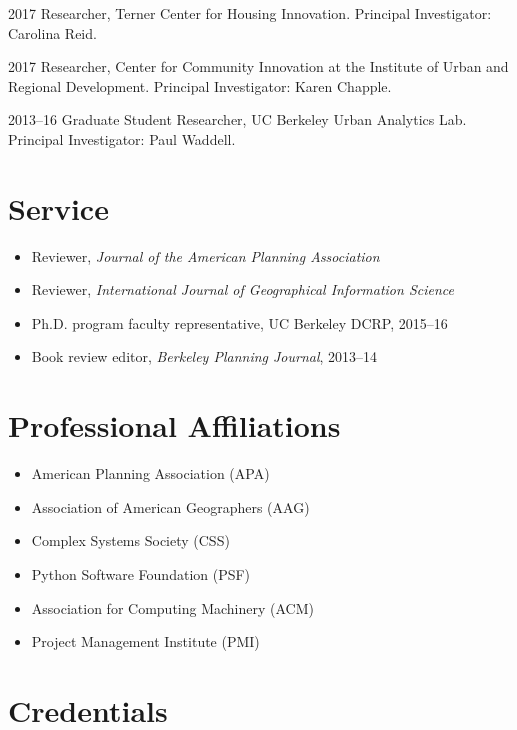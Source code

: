 \documentclass{academiccv}
\begin{document}
\begin{tablist}
\item[2017] 	\tab Researcher, Terner Center for Housing Innovation. Principal Investigator: Carolina Reid.
\item[2017] 	\tab Researcher, Center for Community Innovation at the Institute of Urban and Regional Development. Principal Investigator: Karen Chapple.
\item[2013--16] \tab Graduate Student Researcher, UC Berkeley Urban Analytics Lab. Principal Investigator: Paul Waddell.
\end{tablist}



\section*{Service}

\begin{itemize}
\item Reviewer, \emph{Journal of the American Planning Association}
\item Reviewer, \emph{International Journal of Geographical Information Science}
\item Ph.D. program faculty representative, UC Berkeley DCRP, 2015--16
\item Book review editor, \emph{Berkeley Planning Journal}, 2013--14
\end{itemize}



\section*{Professional Affiliations}

\begin{itemize}
\item American Planning Association (APA)
\item Association of American Geographers (AAG)
\item Complex Systems Society (CSS)
\item Python Software Foundation (PSF)
\item Association for Computing Machinery (ACM)
\item Project Management Institute (PMI)
\end{itemize}



\section*{Credentials}
\end{document}
